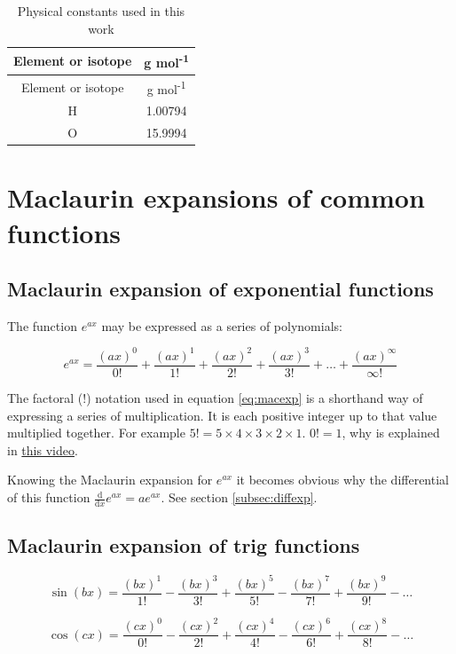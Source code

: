 \documentclass[
]{book}
\begin{document}
\begin{longtable}[]{@{}cc@{}}
\caption{Physical constants used in this work\label{tab:physicalconst}}\tabularnewline
\toprule
Element or isotope & g mol\textsuperscript{-1}\tabularnewline
\midrule
\endfirsthead
\toprule
Element or isotope & g mol\textsuperscript{-1}\tabularnewline
\midrule
\endhead
H & 1.00794\tabularnewline
O & 15.9994\tabularnewline
\bottomrule
\end{longtable}

\hypertarget{sec:maclaurin}{%
\section{Maclaurin expansions of common functions}\label{sec:maclaurin}}

\hypertarget{subsec:macexp}{%
\subsection{Maclaurin expansion of exponential functions}\label{subsec:macexp}}

The function \(e^{ax}\) may be expressed as a series of polynomials:

\begin{equation}
e^{ax} = \frac{(ax)^0}{0!} + \frac{(ax)^1}{1!} + \frac{(ax)^2}{2!} + \frac{(ax)^3}{3!} + \dots + \frac{(ax)^\infty}{\infty!}
\label{eq:macexp}
\end{equation}

The factoral (\(!\)) notation used in equation \eqref{eq:macexp} is a shorthand way of expressing a series of multiplication. It is each positive integer up to that value multiplied together. For example \(5! = 5 \times 4 \times 3\times 2 \times 1\). \(0!=1\), why is explained in \href{https://www.youtube.com/watch?v=Mfk_L4Nx2ZI}{this video}.

Knowing the Maclaurin expansion for \(e^{ax}\) it becomes obvious why the differential of this function \(\frac{\textrm{d}}{\textrm{d}x}e^{ax}=ae^{ax}\). See section \ref{subsec:diffexp}.

\hypertarget{subsec:mactrig}{%
\subsection{Maclaurin expansion of trig functions}\label{subsec:mactrig}}

\begin{equation}
\sin(bx) = \frac{(bx)^1}{1!} - \frac{(bx)^3}{3!} + \frac{(bx)^5}{5!} - \frac{(bx)^7}{7!}  + \frac{(bx)^9}{9!} - \dots
\label{eq:macsin}
\end{equation}

\begin{equation}
\cos(cx) = \frac{(cx)^0}{0!} - \frac{(cx)^2}{2!} + \frac{(cx)^4}{4!} - \frac{(cx)^6}{6!}  + \frac{(cx)^8}{8!} - \dots
\label{eq:maccos}
\end{equation}

  
\end{document}
